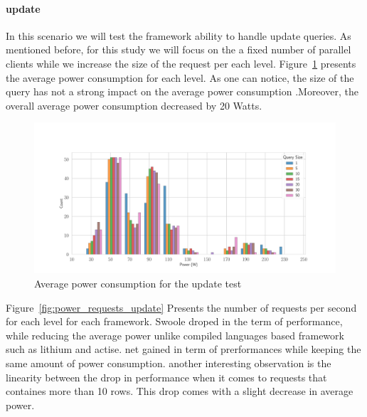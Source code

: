 \paragraph{update}
In this scenario we will test the framework ability to handle update queries. As mentioned before,  for this study we will focus on the a fixed number of parallel clients while we increase the size of the request per each level.
Figure~\ref{fig:av_power_update} presents the average power consumption for each level. As one can notice, the size of the query has not a strong impact on the average power consumption .Moreover, the overall average power consumption decreased by 20 Watts.
\begin{figure}[hbt]
    \centering
    \includegraphics[width=\textwidth,height=\textheight,keepaspectratio]{imgs/histogram_av_power_cpu_update}
    \caption{Average power consumption for the update test }
    \label{fig:av_power_update}
\end{figure}
Figure~\ref{fig:power_requests_update} Presents the number of requests per second for each level for each framework. Swoole droped in the term of performance, while reducing the average power unlike compiled languages based framework such as lithium and actise. net gained in term of prerformances while keeping the same amount of power consumption. another interesting observation is the linearity between the drop in performance when it comes to requests that containes more than 10 rows. This drop comes with a slight decrease in average power.

